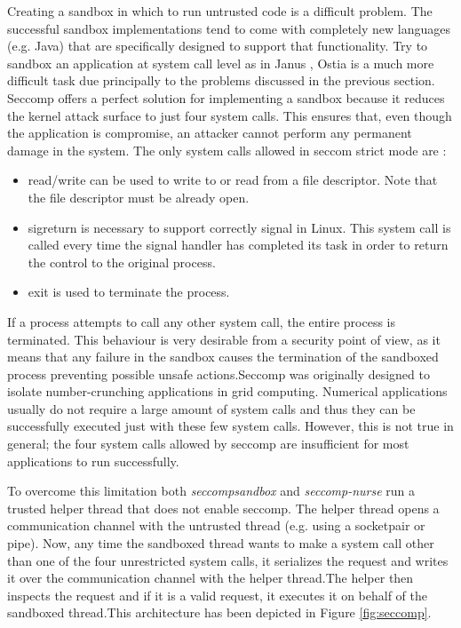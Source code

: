 Creating a sandbox in which to run untrusted code is a difficult problem. The successful sandbox implementations tend to come with completely new languages (e.g. Java) that are specifically designed to support that functionality. Try to sandbox an application at system call level as in Janus \cite{ Janus}, Ostia \cite{Garfinkel03ostia:a} is a much more difficult task due principally to the problems discussed in the previous section.
Seccomp offers a perfect solution for implementing a sandbox because it reduces the kernel attack surface to just four system calls. This ensures that, even though the application is compromise, an attacker cannot perform any permanent damage in the system. The only system calls allowed in seccom strict mode are : 
\begin{itemize}
\item  read/write can be used to write to or read from a file descriptor. Note that the file descriptor must be already open. 
\item  sigreturn is necessary to support correctly signal in Linux. This system call is called every time the signal handler has completed its task in order to return the control 	   to the original process. 
\item  exit	is used to terminate the process. 
\end{itemize}

If a process attempts to call any other system call, the entire process is terminated. This behaviour is very desirable from a security point of view, as it means that any failure in the sandbox causes the termination of the sandboxed process preventing possible unsafe actions.Seccomp was originally designed to isolate number-crunching applications in grid computing. Numerical applications usually do not require a large amount of system calls and thus they can be successfully executed just with these few system calls. However, this is not true in general; the four system calls allowed by seccomp are insufficient for most applications to run successfully. 

To overcome this limitation both \emph{seccompsandbox} and \emph{seccomp-nurse} run a trusted helper thread that does not enable seccomp. The helper thread opens a communication channel with the untrusted thread (e.g. using a socketpair or pipe). Now, any time the sandboxed thread wants to make a system call other than one of the four unrestricted system calls, it serializes the request and writes it over the communication channel with the helper thread.The helper then inspects the request and if it is a valid request, it executes it  on behalf of the sandboxed thread.This architecture has been depicted in Figure \ref{fig:seccomp}. 

